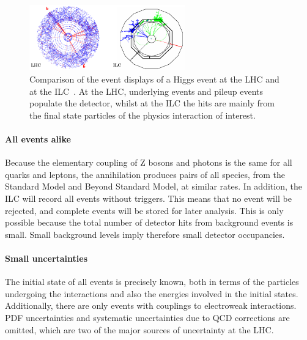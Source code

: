 \begin{figure}[H]
\centering
\includegraphics[width=0.6\textwidth]{Figures/Cleanliness.png}
\caption[Clean environment at the ILC]{Comparison of the event displays of a Higgs event at the  LHC and at the ILC~\cite[based on p. 4]{ILCPhysics_Thomson}.
At the LHC, underlying events and pileup events populate the detector, whilst at the ILC the hits are mainly from the final state particles of the physics interaction of interest.
}
\label{fig:Cleanliness}
\end{figure}

\paragraph{All events alike}
Because the elementary coupling of Z bosons and photons is the same for all quarks and leptons, the \positron\electron annihilation produces pairs of all species, from the Standard Model and Beyond Standard Model, at similar rates.
In addition, the ILC will record all events without triggers.
This means that no event will be rejected, and complete events will be stored for later analysis.
This is only possible because the total number of detector hits from background events is small.
Small background levels imply therefore small detector occupancies.

\paragraph{Small uncertainties}
The initial state of all events is precisely known, both in terms of the particles undergoing the interactions and also the energies involved in the initial states.
Additionally, there are only events with couplings to electroweak interactions.\\
PDF uncertainties and systematic uncertainties due to QCD corrections are omitted, which are two of the major sources of uncertainty at the LHC.

